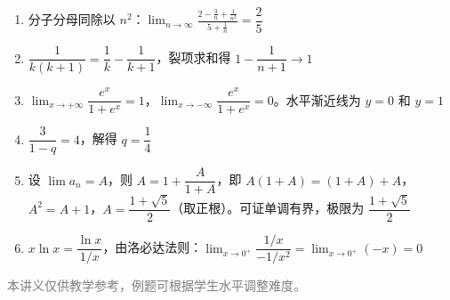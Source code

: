 \documentclass[12pt, a4paper]{ctexart}
\begin{document}
\vspace{20pt}

\begin{knowledgebox}[参考答案]
\begin{enumerate}[leftmargin=2em]
  \item 分子分母同除以 $n^2$：$\displaystyle\lim_{n \to \infty} \frac{2 - \frac{3}{n} + \frac{1}{n^2}}{5 + \frac{1}{n}} = \boxed{\dfrac{2}{5}}$

  \item $\dfrac{1}{k(k+1)} = \dfrac{1}{k} - \dfrac{1}{k+1}$，裂项求和得 $1 - \dfrac{1}{n+1} \to \boxed{1}$

  \item $\lim_{x \to +\infty} \dfrac{e^x}{1+e^x} = 1$，$\lim_{x \to -\infty} \dfrac{e^x}{1+e^x} = 0$。水平渐近线为 $\boxed{y = 0 \text{ 和 } y = 1}$

  \item $\dfrac{3}{1-q} = 4$，解得 $\boxed{q = \dfrac{1}{4}}$

  \item 设 $\lim a_n = A$，则 $A = 1 + \dfrac{A}{1+A}$，即 $A(1+A) = (1+A) + A$，$A^2 = A + 1$，$A = \dfrac{1+\sqrt{5}}{2}$（取正根）。可证单调有界，极限为 $\boxed{\dfrac{1+\sqrt{5}}{2}}$

  \item $x \ln x = \dfrac{\ln x}{1/x}$，由洛必达法则：$\lim_{x \to 0^+} \dfrac{1/x}{-1/x^2} = \lim_{x \to 0^+} (-x) = \boxed{0}$
\end{enumerate}
\end{knowledgebox}

\vfill
\begin{center}
\small\textcolor{gray}{本讲义仅供教学参考，例题可根据学生水平调整难度。}
\end{center}
\end{document}
